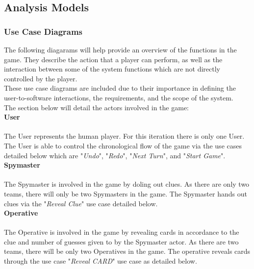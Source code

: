 \documentclass[10pt, a4paper]{article}
\begin{document}
	\subsection{Analysis Models}
	
	\subsubsection{Use Case Diagrams}
	
	The following diagarams will help provide an overview of the functions in the game. They describe the action that a player can perform, as well as the interaction between some of the system functions which are not directly controlled by the player.\\
	
	These use case diagrams are included due to their importance in defining the user-to-software interactions, the requirements, and the scope of the system.\\
	
	The section below will detail the actors involved in the game: \\
	
	\textbf{User} \\
	\\
	The User represents the human player. For this iteration there is only one User. The User is able to control the chronological flow of the game via the use cases detailed below which are "\textit{Undo}", "\textit{Redo}", "\textit{Next Turn}", and "\textit{Start Game}".\\
	
	\textbf{Spymaster}\\
	\\
	The Spymaster is involved in the game by doling out clues. As there are only two teams, there will only be two Spymasters in the game. The Spymaster hands out clues via the "\textit{Reveal Clue}" use case detailed below.\\
	
	\textbf{Operative}\\
	\\
	The Operative is involved in the game by revealing cards in accordance to the clue and number of guesses given to by the Spymaster actor. As there are two teams, there will be only two Operatives in the game. The operative reveals cards through the use case "\textit{Reveal CARD}" use case as detailed below.\\
	
	\newpage
	
\end{document}
